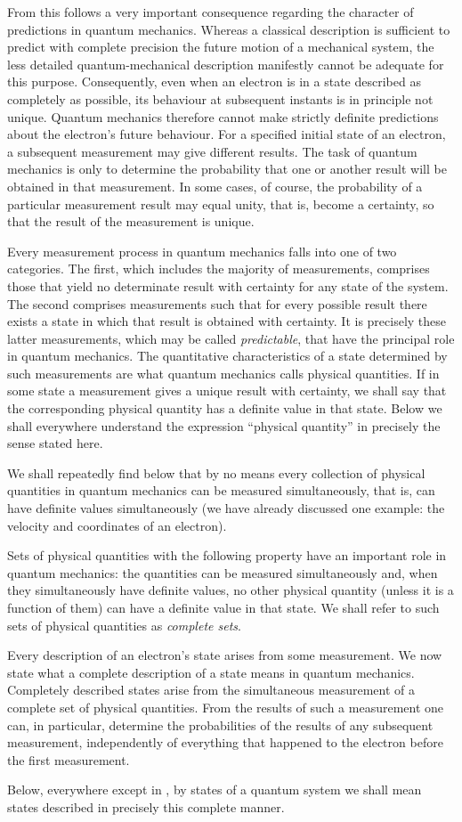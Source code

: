 From this follows a very important consequence regarding the character of
predictions in quantum mechanics. Whereas a classical description is
sufficient to predict with complete precision the future motion of a
mechanical system, the less detailed quantum-mechanical description manifestly
cannot be adequate for this purpose.
Consequently, even when an electron is in a state described as completely as
possible, its behaviour at subsequent instants is in principle not unique.
Quantum mechanics therefore cannot make strictly definite predictions about
the electron's future behaviour. For a specified initial state of an electron,
a subsequent measurement may give different results. The task of quantum
mechanics is only to determine the probability that one or another result will
be obtained in that measurement. In some cases, of course, the probability of
a particular measurement result may equal unity, that is, become a certainty,
so that the result of the measurement is unique.

Every measurement process in quantum mechanics falls into one of two
categories. The first, which includes the majority of measurements, comprises
those that yield no determinate result with certainty for any state of the
system. The second comprises measurements such that for every possible result
there exists a state in which that result is obtained with certainty. It is
precisely these latter measurements, which may be called
\emph{predictable}, that have the principal role in quantum mechanics. The
quantitative characteristics of a state determined by such measurements are
what quantum mechanics calls physical quantities. If in some state a
measurement gives a unique result with certainty, we shall say that the
corresponding physical quantity has a definite value in that state. Below we
shall everywhere%
understand the expression ``physical quantity'' in precisely the sense stated
here.

We shall repeatedly find below that by no means every collection of physical
quantities in quantum mechanics can be measured simultaneously, that is, can
have definite values simultaneously (we have already discussed one example:
the velocity and coordinates of an electron).

Sets of physical quantities with the following property have an important
role in quantum mechanics: the quantities can be measured simultaneously and,
when they simultaneously have definite values, no other physical quantity
(unless it is a function of them) can have a definite value in that state. We
shall refer to such sets of physical quantities as \emph{complete sets}.

Every description of an electron's state arises from some measurement. We now
state what a complete description of a state means in quantum mechanics.
Completely described states arise from the simultaneous measurement of a
complete set of physical quantities. From the results of such a measurement
one can, in particular, determine the probabilities of the results of any
subsequent measurement, independently of everything that happened to the
electron before the first measurement.

Below, everywhere except in , by states of a quantum system we shall mean
states described in precisely this complete manner.
